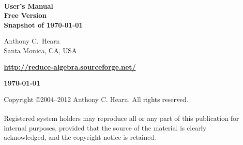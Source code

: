\begin{titlepage}
\setcounter{page}{-1}
\vspace*{\fill}
\begin{center}

{\Huge\bf {\REDUCE}} \\ [0.2cm]
{\LARGE\bf User's Manual\vspace{0.4cm} \\
  Free Version\\
  Snapshot of \today

}

\vspace{0.5in}\large\bf

Anthony C.\ Hearn \\
Santa Monica, CA, USA

\vspace{0.1in}

\textbf{\url{http://reduce-algebra.sourceforge.net/}}

\vspace{0.5in}

\large\bf \today

\end{center}
\vspace{3.0in}
\end{titlepage}

\newpage
\vspace*{3.0in}
\noindent Copyright \copyright 2004--2012 Anthony C. Hearn.  All rights reserved. \\
\mbox{}\\
%
\noindent Registered system holders may reproduce all or any part of this
publication for internal purposes, provided that the source of the
material is clearly acknowledged, and the copyright notice is retained.

